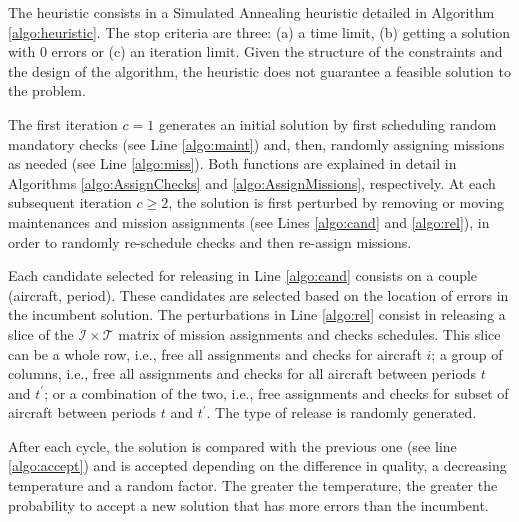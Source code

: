 
  The heuristic consists in a Simulated Annealing heuristic detailed in Algorithm \ref{algo:heuristic}. The stop criteria are three: (a) a time limit, (b) getting a solution with 0 errors or (c) an iteration limit. Given the structure of the constraints and the design of the algorithm, the heuristic does not guarantee a feasible solution to the problem.

  The first iteration $c=1$ generates an initial solution by first scheduling random mandatory checks (see Line \ref{algo:maint}) and, then, randomly assigning missions as needed (see Line \ref{algo:miss}). Both functions are explained in detail in Algorithms \ref{algo:AssignChecks} and \ref{algo:AssignMissions}, respectively. At each subsequent iteration $c \geq 2$, the solution is first perturbed by removing or moving maintenances and mission assignments (see Lines \ref{algo:cand} and \ref{algo:rel}), in order to randomly re-schedule checks and then re-assign missions.

  Each candidate selected for releasing in Line \ref{algo:cand} consists on a couple (aircraft, period). These candidates are selected based on the location of errors in the incumbent solution. The perturbations in Line \ref{algo:rel} consist in releasing a slice of the $\mathcal{I} \times \mathcal{T}$ matrix of mission assignments and checks schedules. This slice can be a whole row, i.e., free all assignments and checks for aircraft $i$; a group of columns, i.e., free all assignments and checks for all aircraft between periods $t$ and $t^\prime$; or a combination of the two, i.e., free assignments and checks for subset of aircraft between periods $t$ and $t^\prime$. The type of release is randomly generated.

  After each cycle, the solution is compared with the previous one (see line \ref{algo:accept}) and is accepted depending on the difference in quality, a decreasing temperature and a random factor. The greater the temperature, the greater the probability to accept a new solution that has more errors than the incumbent.

